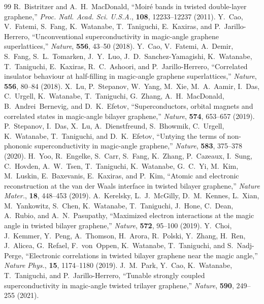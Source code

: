\documentclass[12pt,a4paper]{article}
\begin{document}
\FloatBarrier
\begin{thebibliography}{99}
 R.~Bistritzer and A.~H.~MacDonald, ``Moir{\'e} bands in twisted double-layer graphene,'' \textit{Proc. Natl. Acad. Sci. U.S.A.}, \textbf{108}, 12233--12237 (2011).
 Y.~Cao, V.~Fatemi, S.~Fang, K.~Watanabe, T.~Taniguchi, E.~Kaxiras, and P.~Jarillo-Herrero, ``Unconventional superconductivity in magic-angle graphene superlattices,'' \textit{Nature}, \textbf{556}, 43--50 (2018).
 Y.~Cao, V.~Fatemi, A.~Demir, S.~Fang, S.~L.~Tomarken, J.~Y.~Luo, J.~D.~Sanchez-Yamagishi, K.~Watanabe, T.~Taniguchi, E.~Kaxiras, R.~C.~Ashoori, and P.~Jarillo-Herrero, ``Correlated insulator behaviour at half-filling in magic-angle graphene superlattices,'' \textit{Nature}, \textbf{556}, 80--84 (2018).
 X.~Lu, P.~Stepanov, W.~Yang, M.~Xie, M.~A.~Aamir, I.~Das, C.~Urgell, K.~Watanabe, T.~Taniguchi, G.~Zhang, A.~H.~MacDonald, B.~Andrei~Bernevig, and D.~K.~Efetov, ``Superconductors, orbital magnets and correlated states in magic-angle bilayer graphene,'' \textit{Nature}, \textbf{574}, 653--657 (2019).
 P.~Stepanov, I.~Das, X.~Lu, A.~Dienstfreund, S.~Bhowmik, C.~Urgell, K.~Watanabe, T.~Taniguchi, and D.~K.~Efetov, ``Untying the terms of non-phononic superconductivity in magic-angle graphene,'' \textit{Nature}, \textbf{583}, 375--378 (2020).
 H.~Yoo, R.~Engelke, S.~Carr, S.~Fang, K.~Zhang, P.~Cazeaux, I.~Sung, C.~Hovden, A.~W.~Tsen, T.~Taniguchi, K.~Watanabe, G.~C.~Yi, M.~Kim, M.~Luskin, E.~Baxevanis, E.~Kaxiras, and P.~Kim, ``Atomic and electronic reconstruction at the van der Waals interface in twisted bilayer graphene,'' \textit{Nature Mater.}, \textbf{18}, 448--453 (2019).
 A.~Kerelsky, L.~J.~McGilly, D.~M.~Kennes, L.~Xian, M.~Yankowitz, S.~Chen, K.~Watanabe, T.~Taniguchi, J.~Hone, C.~Dean, A.~Rubio, and A.~N.~Pasupathy, ``Maximized electron interactions at the magic angle in twisted bilayer graphene,'' \textit{Nature}, \textbf{572}, 95--100 (2019).
 Y.~Choi, J.~Kemmer, Y.~Peng, A.~Thomson, H.~Arora, R.~Polski, Y.~Zhang, H.~Ren, J.~Alicea, G.~Refael, F.~von~Oppen, K.~Watanabe, T.~Taniguchi, and S.~Nadj-Perge, ``Electronic correlations in twisted bilayer graphene near the magic angle,'' \textit{Nature Phys.}, \textbf{15}, 1174--1180 (2019).
 J.~M.~Park, Y.~Cao, K.~Watanabe, T.~Taniguchi, and P.~Jarillo-Herrero, ``Tunable strongly coupled superconductivity in magic-angle twisted trilayer graphene,'' \textit{Nature}, \textbf{590}, 249--255 (2021).

\end{thebibliography}
\end{document}
